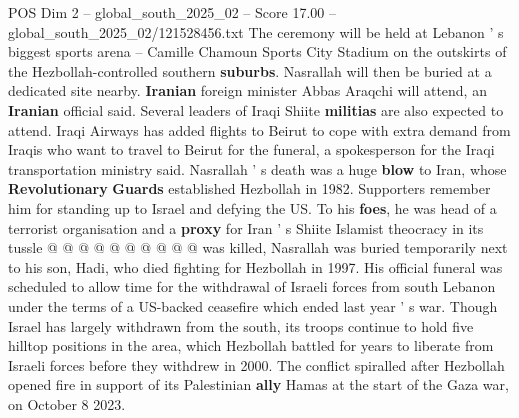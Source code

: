 \begin{textsample}{POS Dim 2 – global\_south\_2025\_02 – Score 17.00 – global\_south\_2025\_02/121528456.txt}
The ceremony will be held at Lebanon ' s biggest sports arena -- Camille Chamoun Sports City Stadium on the outskirts of the Hezbollah-controlled southern \textbf{suburbs}.
Nasrallah will then be buried at a dedicated site nearby. \textbf{Iranian} foreign minister Abbas Araqchi will attend, an \textbf{Iranian} official said.
Several leaders of Iraqi Shiite \textbf{militias} are also expected to attend.
Iraqi Airways has added flights to Beirut to cope with extra demand from Iraqis who want to travel to Beirut for the funeral, a spokesperson for the Iraqi transportation ministry said.
Nasrallah ' s death was a huge \textbf{blow} to Iran, whose \textbf{Revolutionary} \textbf{Guards} established Hezbollah in 1982.
Supporters remember him for standing up to Israel and defying the US.
To his \textbf{foes}, he was head of a terrorist organisation and a \textbf{proxy} for Iran ' s Shiite Islamist theocracy in its tussle @ @ @ @ @ @ @ @ @ @ was killed, Nasrallah was buried temporarily next to his son, Hadi, who died fighting for Hezbollah in 1997.
His official funeral was scheduled to allow time for the withdrawal of Israeli forces from south Lebanon under the terms of a US-backed ceasefire which ended last year ' s war.
Though Israel has largely withdrawn from the south, its troops continue to hold five hilltop positions in the area, which Hezbollah battled for years to liberate from Israeli forces before they withdrew in 2000.
The conflict spiralled after Hezbollah opened fire in support of its Palestinian \textbf{ally} Hamas at the start of the Gaza war, on October 8 2023.

\end{textsample}
